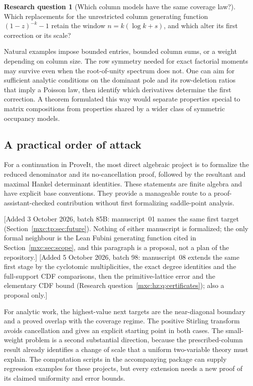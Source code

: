 \documentclass[11pt]{article}
\numberwithin{equation}{section}
\theoremstyle{definition}
\newtheorem{question}{Research question}
\theoremstyle{remark}
\begin{document}
\begin{question}[Which column models have the same coverage law?]
Which replacements for the unrestricted column generating function
$(1-z)^{-k}-1$ retain the window $n=k(\log k+s)$, and which alter its
first correction or its scale?
\end{question}

Natural examples impose bounded entries, bounded column sums, or a
weight depending on column size. The row symmetry needed for exact
factorial moments may survive even when the root-of-unity spectrum does
not. One can aim for sufficient analytic conditions on the dominant
pole and its row-deletion ratios that imply a Poisson law, then identify
which derivatives determine the first correction. A theorem formulated
this way would separate properties special to matrix compositions from
properties shared by a wider class of symmetric occupancy models.

\subsection{A practical order of attack}

For a continuation in ProveIt, the most direct algebraic project is to
formalize the reduced denominator and its no-cancellation proof, followed
by the resultant and maximal Hankel determinant identities. These
statements are finite algebra and have explicit base conventions. They
provide a manageable route to a proof-assistant-checked contribution
without first formalizing saddle-point analysis.

[Added 3 October 2026, batch 85B: manuscript~01 names the same first
target (Section~\ref{mxc:tp:sec:future}). Nothing of either manuscript is
formalized; the only formal neighbour is the Lean Fubini generating
function cited in Section~\ref{mxc:sec:scope}, and this paragraph is a
proposal, not a plan of the repository.] [Added 5 October 2026, batch 98:
manuscript~08 extends the same first stage by the cyclotomic
multiplicities, the exact degree identities and the full-support CDF
comparisons, then the primitive-lattice error and the elementary CDF bound
(Research question~\ref{mxc:hz:q:certificates}); also a proposal only.]

For analytic work, the highest-value next targets are the near-diagonal
boundary and a proved overlap with the coverage regime. The positive
Stirling transform avoids cancellation and gives an explicit starting
point in both cases. The small-weight problem is a second substantial
direction, because the prescribed-column result already identifies a
change of scale that a uniform two-variable theory must explain.
The computation scripts in the accompanying package can supply
regression examples for these projects, but every extension needs a
new proof of its claimed uniformity and error bounds.
\end{document}
